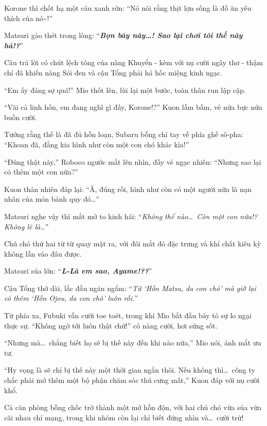 \documentclass[../main.tex]{subfiles}
\begin{document}
Korone thì chốt hạ một câu xanh rờn: ``Nó nói rằng thịt lợn sống là đồ ăn yêu thích của nó\~{}!''

Matsuri gào thét trong lòng: ``\textit{\textbf{Bọn bây này\dots! Sao lại chơi tôi thế này hả!?}}''

Câu trả lời có chút lệch tông của nàng Khuyển - kèm với nụ cười ngây thơ - thậm chí đã khiến nàng Sói đen và cậu Tổng phải há hốc miệng kinh ngạc.


``Em ấy đáng sợ quá!'' Mio thốt lên, lùi lại một bước, toàn thân run lập cập.

``Vãi cả linh hồn, em đang nghĩ gì đấy, Korone!?'' Kuon lầm bầm, vẻ nửa bực nửa buồn cười.

Tưởng rằng thế là đã đủ hỗn loạn, Subaru bỗng chỉ tay về phía ghế sô-pha: ``Khoan đã, đằng kia hình như còn một con chó khác kìa!''

``Đúng thật này,'' Roboco ngước mắt lên nhìn, đầy vẻ ngạc nhiên: ``Nhưng sao lại có thêm một con nữa?''


Kuon thản nhiên đáp lại: ``À, đúng rồi, hình như còn có một người nữa là nạn nhân của món bánh quy đó\dots''

Matsuri nghe vậy thì mắt mở to kinh hãi: ``\textit{Không thể nào\dots\ Còn một con nữa!? Không lẽ là\dots}''

Chú chó thứ hai từ từ quay mặt ra, với đôi mắt đỏ đặc trưng và khí chất kiêu kỳ không lẫn vào đâu được.


Matsuri sủa lớn: ``\textit{\textbf{L-Là em sao, Ayame!??}}''

Cậu Tổng thở dài, lắc đầu ngán ngẩm: ``\textit{Từ `Hồn Matsu, da con chó' mà giờ lại có thêm `Hồn Ojou, da con chó' luôn rồi.}''

Từ phía xa, Fubuki vẫn cười toe toét, trong khi Mio bắt đầu bày tỏ sự lo ngại thực sự. ``Không ngờ tới luôn thật chứ!'' cô nàng cười, hơi sửng sốt.

``Nhưng mà\dots\  chẳng biết họ sẽ bị thế này đến khi nào nữa,'' Mio nói, ánh mắt ưu tư.

``Hy vọng là sẽ chỉ bị thế này một thời gian ngắn thôi. Nếu không thì\dots\  công ty chắc phải mở thêm một bộ phận chăm sóc thú cưng mất,'' Kuon đáp với nụ cười khổ.

Cả căn phòng bỗng chốc trở thành một mớ hỗn độn, với hai chú chó vừa sủa vừa cãi nhau chí mạng, trong khi nhóm còn lại chỉ biết đứng nhìn và\dots\ cười trừ!
\end{document}
